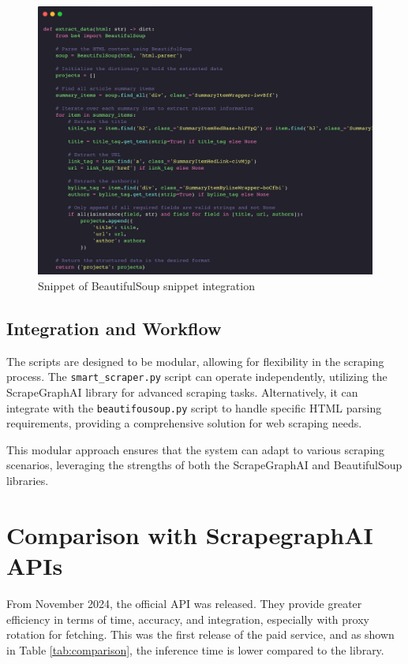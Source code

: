 \begin{figure}[h!]
    \centering
    \includegraphics[width=0.95\linewidth]{Assets/beautifousoup.png}
    \caption{Snippet of BeautifulSoup snippet integration}
    \label{fig:beautifousoup}
\end{figure}

\subsection{Integration and Workflow}

The scripts are designed to be modular, allowing for flexibility in the scraping process. The \texttt{smart\_scraper.py} script can operate independently, utilizing the ScrapeGraphAI library for advanced scraping tasks. Alternatively, it can integrate with the \texttt{beautifousoup.py} script to handle specific HTML parsing requirements, providing a comprehensive solution for web scraping needs.

This modular approach ensures that the system can adapt to various scraping scenarios, leveraging the strengths of both the ScrapeGraphAI and BeautifulSoup libraries.

\section{Comparison with ScrapegraphAI APIs}
From November 2024, the official API was released. They provide greater efficiency in terms of time, accuracy, and integration, especially with proxy rotation for fetching. This was the first release of the paid service, and as shown in Table \ref{tab:comparison}, the inference time is lower compared to the library.

